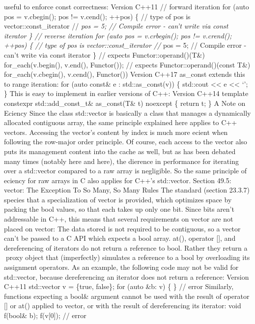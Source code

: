 useful to enforce const correctness: Version C++11 // forward iteration
for (auto pos = v.cbegin(); pos != v.cend(); ++pos) \{ // type of pos is
vector::const\_iterator // \emph{pos = 5; // Compile error - can't write
via const iterator \} // reverse iteration for (auto pos = v.crbegin();
pos != v.crend(); ++pos) \{ // type of pos is vector::const\_iterator //
}pos = 5; // Compile error - can't write via const iterator \} //
expects Functor::operand()(T\&) for\_each(v.begin(), v.end(),
Functor()); // expects Functor::operand()(const T\&)
for\_each(v.cbegin(), v.cend(), Functor()) Version C++17 as\_const
extends this to range iteration: for (auto const\& e :
std::as\_const(v)) \{ std::cout \textless\textless{} e
\textless\textless{} `\n'; \} This is easy to implement in earlier
versions of C++: Version C++14 template constexpr std::add\_const\_t\&
as\_const(T\& t) noexcept \{ return t; \} A Note on Eciency Since the
class std::vector is basically a class that manages a dynamically
allocated contiguous array, the same principle explained here applies to
C++ vectors. Accessing the vector's content by index is much more ecient
when following the row-major order principle. Of course, each access to
the vector also puts its management content into the cache as well, but
as has been debated many times (notably here and here), the dierence in
performance for iterating over a std::vector compared to a raw array is
negligible. So the same principle of eciency for raw arrays in C also
applies for C++'s std::vector. Section 49.5: vector: The Exception To So
Many, So Many Rules The standard (section 23.3.7) species that a
specialization of vector is provided, which optimizes space by packing
the bool values, so that each takes up only one bit. Since bits aren't
addressable in C++, this means that several requirements on vector are
not placed on vector: The data stored is not required to be contiguous,
so a vector can't be passed to a C API which expects a bool array. at(),
operator {[}{]}, and dereferencing of iterators do not return a
reference to bool. Rather they return a proxy object that (imperfectly)
simulates a reference to a bool by overloading its assignment operators.
As an example, the following code may not be valid for std::vector,
because dereferencing an iterator does not return a reference: Version
C++11 std::vector v = \{true, false\}; for (auto \&b: v) \{ \} // error
Similarly, functions expecting a bool\& argument cannot be used with the
result of operator {[}{]} or at() applied to vector, or with the result
of dereferencing its iterator: void f(bool\& b); f(v{[}0{]}); // error
